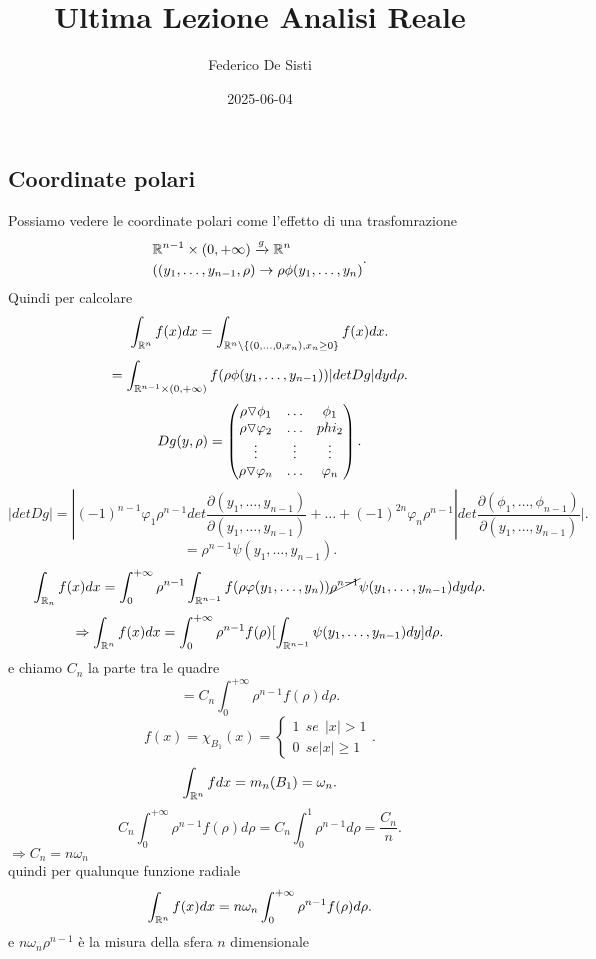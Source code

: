 \documentclass[12px]{article}
\title{Ultima Lezione Analisi Reale}
\date{2025-06-04}
\author{Federico De Sisti}
\begin{document}
	\maketitle
	\newpage
	\subsection{Coordinate polari}
	Possiamo vedere le coordinate polari come l'effetto di una trasfomrazione
	\[
		\begin{aligned}
		&\mathbb{R}^{n-1}\times (0,+\infty) \xrightarrow {g}\mathbb{R}^n\\
		& ((y_1,\ldots,y_{n-1},\rho) \rightarrow \rho \phi(y_1,\ldots, y_n)
		\end{aligned} .\] 
		Quindi per calcolare
		 \[
			 \int_{\mathbb{R}^n} f(x)dx = \int_{\mathbb{R}^n\setminus\{(0,\ldots,0,x_n), x_n\geq 0\}}f(x)dx
		.\] 
		\[
			= \int_{\mathbb{R}^{n-1}\times (0,+\infty)}f(\rho\phi(y_1,\ldots,y_{n-1}))|det Dg| dy d\rho
		.\] 
		\[
			Dg(y,\rho) = \matrice{\rho \triangledown \phi_1& \ldots  & \phi_1\\
				\rho\triangledown \varphi_2 & \ldots & phi_2\\
				\vdots & \vdots & \vdots\\
				\rho\triangledown \varphi_n & \ldots & \varphi_n
			}

		.\] 
		\[
			|det Dg| = |(-1)^{n-1} \varphi_1\rho^{n-1}det\frac{\partial (y_1,\ldots, y_{n-1})}{\partial (y_1,\ldots, y_{n-1})} + \ldots + (-1)^{2n} \varphi_n\rho^{n-1}| det\frac{\partial ( \phi_1,\ldots, \phi_{n-1})}{\partial(y_1,\ldots, y_{n-1})} |

		.\] 
		\[
	= \rho^{n-1} \psi( y_1,\ldots, y_{n-1})	
		.\] 
		\[
			\int_{\mathbb{R}_n}f(x)dx = \int_0^{+\infty}\rho^{n-1}\int_{\mathbb{R}^{n-1}}f( \rho \varphi(y_1,\ldots, y_n))\cancel{\rho^{n-1}}\psi(y_1,\ldots,y_{n-1})dyd\rho
		.\] 
		\[
			\Rightarrow \int_{\mathbb{R}^n}f(x)dx = \int^{+\infty}_0\rho^{n-1}f(\rho)[\int_{\mathbb{R}^{n-1}}\psi(y_1,\ldots,y_{n-1})dy]d\rho
		.\] 
		e chiamo $C_n$ la parte tra le quadre
		\[
			= C_n\int_0^{+\infty}\rho^{n-1}f(\rho)d\rho
		.\] 
		\[
			f(x) = \chi_{B_1}(x) = \begin{cases}
				1\ \ se \ \ |x|>1\\
				0 \ \ se |x|\geq 1
			\end{cases}
		.\] 
		\[
			\int_{\mathbb{R}^n}f dx = m_n(B_1) = \omega_n
		.\] 
		\[
			C_n\int_0^{+\infty} \rho^{n-1}f(\rho)d\rho = C_n\int_0^1\rho^{n-1}d\rho = \frac {C_n}n
		.\] 
		$ \Rightarrow  C_n = n\omega_n$ \\
		quindi per qualunque funzione radiale
		\[
			\int_{\mathbb{R}^n}f(x) dx = n\omega_n\int_0^{+\infty}\rho^{n-1}f(\rho)d\rho
		.\] 
		e $n\omega_n\rho^{n-1}$ è la misura della sfera $n$ dimensionale\\
\end{document}
